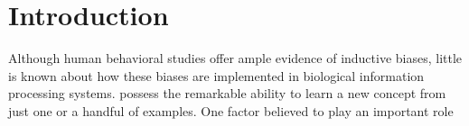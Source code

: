 \section{Introduction}

Although human behavioral studies offer ample evidence
of inductive biases, little is known about how these biases are implemented
in biological information processing systems.
possess the remarkable ability to learn a new concept from just
one or a handful of examples. One factor believed to play an important role

